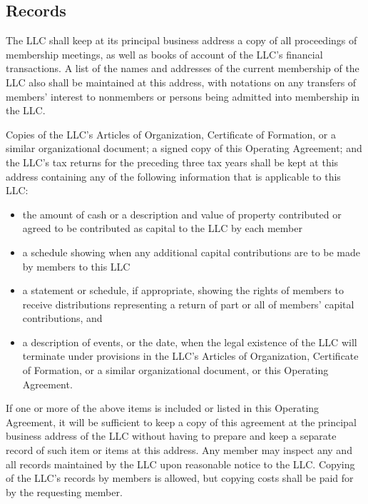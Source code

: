 \documentclass{article}
\begin{document}
			\subsection{Records}
			The LLC shall keep at its principal business address a copy of all proceedings of membership meetings, as well as books of account of the LLC's financial transactions. A list of the names and addresses of the current membership of the LLC also shall be maintained at this address, with notations on any transfers of members' interest to nonmembers or persons being admitted into membership in the LLC.

			\indent Copies of the LLC's Articles of Organization, Certificate of Formation, or a similar organizational document; a signed copy of this Operating Agreement; and the LLC's tax returns for the preceding three tax years shall be kept at this address containing any of the following information that is applicable to this LLC:

				\begin{itemize}
					\item the amount of cash or a description and value of property contributed or agreed to be contributed as capital to the LLC by each member

					\item a schedule showing when any additional capital contributions are to be made by members to this LLC

					\item a statement or schedule, if appropriate, showing the rights of members to receive distributions representing a return of part or all of members' capital contributions, and

					\item a description of events, or the date, when the legal existence of the LLC will terminate under provisions in the LLC's Articles of Organization, Certificate of Formation, or a similar organizational document, or this Operating Agreement.

				\end{itemize}

			If one or more of the above items is included or listed in this Operating Agreement, it will be sufficient to keep a copy of this agreement at the principal business address of the LLC without having to prepare and keep a separate record of such item or items at this address.
			\indent Any member may inspect any and all records maintained by the LLC upon reasonable notice to the LLC. Copying of the LLC's records by members is allowed, but copying costs shall be paid for by the requesting member.
\end{document}
